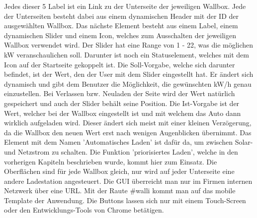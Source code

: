Jedes dieser 5 Label ist ein Link zu der Unterseite der jeweiligen Wallbox. Jede der Unterseiten besteht dabei aus einem dynamischen Header mit der ID der ausgewählten Wallbox. Das nächste Element besteht aus einem Label, einem dynamischen Slider und einem Icon, welches zum Ausschalten der jeweiligen Wallbox verwendet wird. Der Slider hat eine Range von 1 - 22, was die möglichen kW veranschaulichen soll. Darunter ist noch ein Statuselement, welches mit dem Icon auf der Startseite gekoppelt ist. Die Soll-Vorgabe, welche sich darunter befindet, ist der Wert, den der User mit dem Slider eingestellt hat. Er ändert sich dynamisch und gibt dem Benutzer die Möglichkeit, die gewünschten kW/h genau einzustellen. Bei Verlassen bzw. Neuladen der Seite wird der Wert natürlich gespeichert und auch der Slider behält seine Position. Die Ist-Vorgabe ist der Wert, welcher bei der Wallbox eingestellt ist und mit welchem das Auto dann wirklich aufgeladen wird. Dieser ändert sich meist mit einer kleinen Verzögerung, da die Wallbox den neuen Wert erst nach wenigen Augenblicken übernimmt. Das Element mit dem Namen 'Automatisches Laden' ist dafür da, um zwischen Solar- und Netzstrom zu schalten. Die Funktion 'priorisiertes Laden', welche in den vorherigen Kapiteln beschrieben wurde, kommt hier zum Einsatz. Die Oberflächen sind für jede Wallbox gleich, nur wird auf jeder Unterseite eine andere Ladestation angesteuert. Die GUI überreicht man nur im Firmen internen Netzwerk über eine URL. Mit der Raute \#walli kommt man auf das mobile Template der Anwendung. Die Buttons lassen sich nur mit einem Touch-Screen oder den Entwicklungs-Tools von Chrome betätigen.


